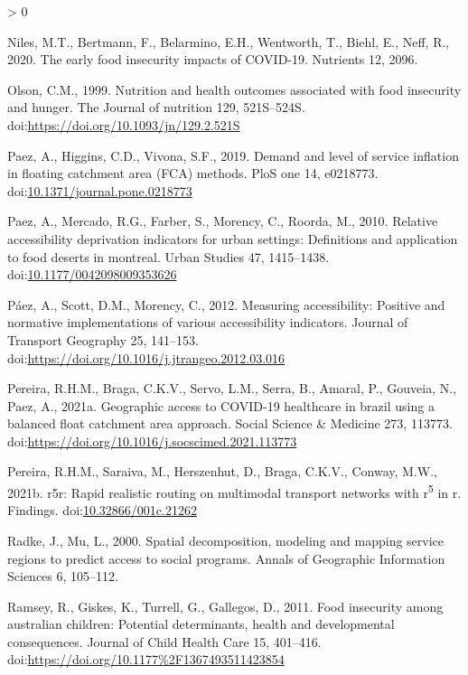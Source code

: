 \documentclass[]{elsarticle} %
\newlength{\cslhangindent}
\newenvironment{CSLReferences}[2] %
 {%
  \setlength{\parindent}{0pt}
  \ifodd #1 \everypar{\setlength{\hangindent}{\cslhangindent}}\ignorespaces\fi
  \ifnum #2 > 0
  \setlength{\parskip}{#2\baselineskip}
  \fi
 }%
 {}
\begin{document}
\begin{CSLReferences}{1}{0}
\leavevmode\hypertarget{ref-niles2020early}{}%
Niles, M.T., Bertmann, F., Belarmino, E.H., Wentworth, T., Biehl, E.,
Neff, R., 2020. The early food insecurity impacts of COVID-19. Nutrients
12, 2096.

\leavevmode\hypertarget{ref-olson1999nutrition}{}%
Olson, C.M., 1999. Nutrition and health outcomes associated with food
insecurity and hunger. The Journal of nutrition 129, 521S--524S.
doi:\url{https://doi.org/10.1093/jn/129.2.521S}

\leavevmode\hypertarget{ref-paez2019demand}{}%
Paez, A., Higgins, C.D., Vivona, S.F., 2019. Demand and level of service
inflation in floating catchment area (FCA) methods. PloS one 14,
e0218773.
doi:\href{https://doi.org/10.1371/journal.pone.0218773}{10.1371/journal.pone.0218773}

\leavevmode\hypertarget{ref-paez2010relative}{}%
Paez, A., Mercado, R.G., Farber, S., Morency, C., Roorda, M., 2010.
Relative accessibility deprivation indicators for urban settings:
Definitions and application to food deserts in montreal. Urban Studies
47, 1415--1438.
doi:\href{https://doi.org/10.1177/0042098009353626}{10.1177/0042098009353626}

\leavevmode\hypertarget{ref-paez2012measuring}{}%
Páez, A., Scott, D.M., Morency, C., 2012. Measuring accessibility:
Positive and normative implementations of various accessibility
indicators. Journal of Transport Geography 25, 141--153.
doi:\url{https://doi.org/10.1016/j.jtrangeo.2012.03.016}

\leavevmode\hypertarget{ref-pereira2021geographic}{}%
Pereira, R.H.M., Braga, C.K.V., Servo, L.M., Serra, B., Amaral, P.,
Gouveia, N., Paez, A., 2021a. Geographic access to COVID-19 healthcare
in brazil using a balanced float catchment area approach. Social Science
\& Medicine 273, 113773.
doi:\url{https://doi.org/10.1016/j.socscimed.2021.113773}

\leavevmode\hypertarget{ref-pereira2021r5r}{}%
Pereira, R.H.M., Saraiva, M., Herszenhut, D., Braga, C.K.V., Conway,
M.W., 2021b. r5r: Rapid realistic routing on multimodal transport
networks with r\textsuperscript{5} in r. Findings.
doi:\href{https://doi.org/10.32866/001c.21262}{10.32866/001c.21262}

\leavevmode\hypertarget{ref-radke2000spatial}{}%
Radke, J., Mu, L., 2000. Spatial decomposition, modeling and mapping
service regions to predict access to social programs. Annals of
Geographic Information Sciences 6, 105--112.

\leavevmode\hypertarget{ref-ramsey2011food}{}%
Ramsey, R., Giskes, K., Turrell, G., Gallegos, D., 2011. Food insecurity
among australian children: Potential determinants, health and
developmental consequences. Journal of Child Health Care 15, 401--416.
doi:\url{https://doi.org/10.1177\%2F1367493511423854}


\end{CSLReferences}
\end{document}
